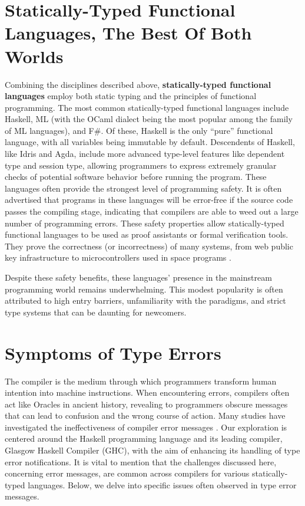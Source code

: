 \section{Statically-Typed Functional Languages, The Best Of Both Worlds}
Combining the disciplines described above, \textbf{statically-typed functional languages} employ both static typing and the principles of functional programming. The most common statically-typed functional languages include Haskell,  ML (with the OCaml dialect being the most popular among the family of ML languages), and F\#. 
Of these, Haskell is the only ``pure'' functional language, with all variables being immutable by default.
Descendents of Haskell, like Idris and Agda, include more advanced type-level features like dependent type and session type, allowing programmers to express extremely granular checks of potential software behavior before running the program. These languages often provide the strongest level of programming safety. It is often advertised that programs in these languages will be error-free if the source code passes the compiling stage, indicating that compilers are able to weed out a large number of programming errors. These safety properties allow statically-typed functional languages to be used as proof assistants or formal verification tools. They prove the correctness (or incorrectness) of many systems, from web public key infrastructure \cite{Bhargavan2021-no} to microcontrollers used in space programs \cite{Mokhov2019-zj}. 

Despite these safety benefits, these languages' presence in the mainstream programming world remains underwhelming. This modest popularity is often attributed to high entry barriers, unfamiliarity with the paradigms, and strict type systems that can be daunting for newcomers.

\section{Symptoms of Type Errors}
\label{sec:symptoms}
 The compiler is the medium through which programmers transform human intention into machine instructions. When encountering errors, compilers often act like Oracles in ancient history, revealing to programmers obscure messages that can lead to confusion and the wrong course of action. Many studies have investigated the ineffectiveness of compiler error messages \cite{Barik2017-gy, Becker2019-cs, Becker2016-kc}.  Our exploration is centered around the Haskell programming language and its leading compiler, Glasgow Haskell Compiler (GHC), with the aim of enhancing its handling of type error notifications. It is vital to mention that the challenges discussed here, concerning error messages, are common across compilers for various statically-typed languages. Below, we delve into specific issues often observed in type error messages.


